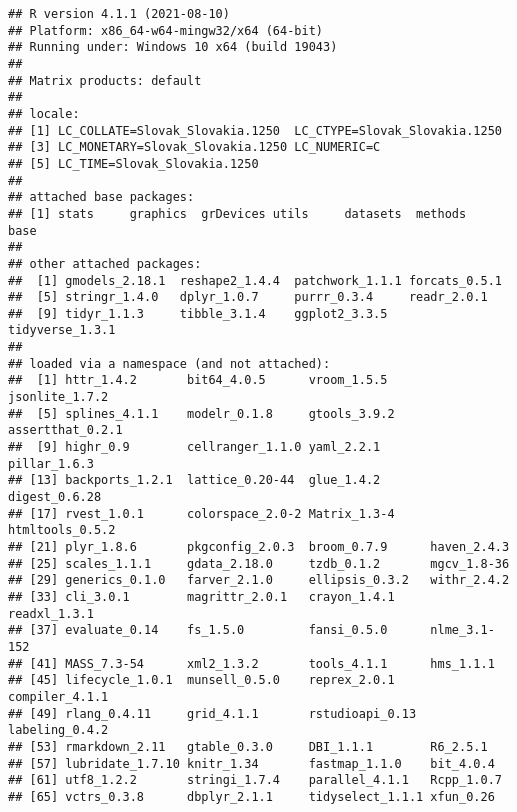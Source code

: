 \documentclass[
]{article}
\begin{document}
\begin{verbatim}
## R version 4.1.1 (2021-08-10)
## Platform: x86_64-w64-mingw32/x64 (64-bit)
## Running under: Windows 10 x64 (build 19043)
## 
## Matrix products: default
## 
## locale:
## [1] LC_COLLATE=Slovak_Slovakia.1250  LC_CTYPE=Slovak_Slovakia.1250   
## [3] LC_MONETARY=Slovak_Slovakia.1250 LC_NUMERIC=C                    
## [5] LC_TIME=Slovak_Slovakia.1250    
## 
## attached base packages:
## [1] stats     graphics  grDevices utils     datasets  methods   base     
## 
## other attached packages:
##  [1] gmodels_2.18.1  reshape2_1.4.4  patchwork_1.1.1 forcats_0.5.1  
##  [5] stringr_1.4.0   dplyr_1.0.7     purrr_0.3.4     readr_2.0.1    
##  [9] tidyr_1.1.3     tibble_3.1.4    ggplot2_3.3.5   tidyverse_1.3.1
## 
## loaded via a namespace (and not attached):
##  [1] httr_1.4.2       bit64_4.0.5      vroom_1.5.5      jsonlite_1.7.2  
##  [5] splines_4.1.1    modelr_0.1.8     gtools_3.9.2     assertthat_0.2.1
##  [9] highr_0.9        cellranger_1.1.0 yaml_2.2.1       pillar_1.6.3    
## [13] backports_1.2.1  lattice_0.20-44  glue_1.4.2       digest_0.6.28   
## [17] rvest_1.0.1      colorspace_2.0-2 Matrix_1.3-4     htmltools_0.5.2 
## [21] plyr_1.8.6       pkgconfig_2.0.3  broom_0.7.9      haven_2.4.3     
## [25] scales_1.1.1     gdata_2.18.0     tzdb_0.1.2       mgcv_1.8-36     
## [29] generics_0.1.0   farver_2.1.0     ellipsis_0.3.2   withr_2.4.2     
## [33] cli_3.0.1        magrittr_2.0.1   crayon_1.4.1     readxl_1.3.1    
## [37] evaluate_0.14    fs_1.5.0         fansi_0.5.0      nlme_3.1-152    
## [41] MASS_7.3-54      xml2_1.3.2       tools_4.1.1      hms_1.1.1       
## [45] lifecycle_1.0.1  munsell_0.5.0    reprex_2.0.1     compiler_4.1.1  
## [49] rlang_0.4.11     grid_4.1.1       rstudioapi_0.13  labeling_0.4.2  
## [53] rmarkdown_2.11   gtable_0.3.0     DBI_1.1.1        R6_2.5.1        
## [57] lubridate_1.7.10 knitr_1.34       fastmap_1.1.0    bit_4.0.4       
## [61] utf8_1.2.2       stringi_1.7.4    parallel_4.1.1   Rcpp_1.0.7      
## [65] vctrs_0.3.8      dbplyr_2.1.1     tidyselect_1.1.1 xfun_0.26
\end{verbatim}
\end{document}
